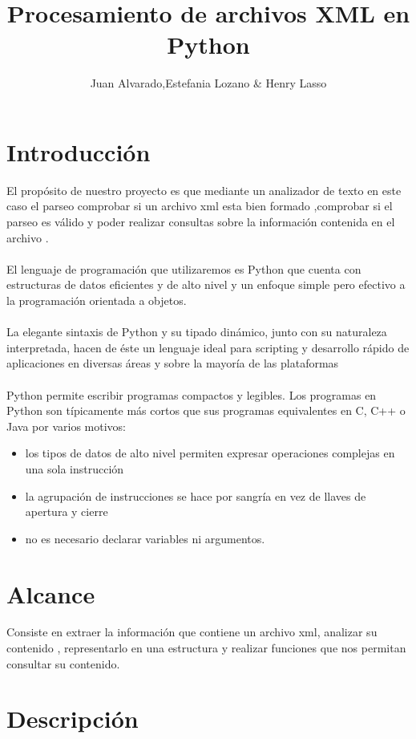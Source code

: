 \documentclass[11pt]{article} %
\title{Procesamiento de archivos  XML  en Python}
\author{Juan Alvarado,Estefania Lozano \&  Henry Lasso}
\begin{document}
\maketitle

\section{Introducción}
El propósito de nuestro proyecto es que  mediante un analizador de texto en este caso el parseo comprobar si un archivo xml esta bien formado ,comprobar si el parseo es válido y poder realizar consultas sobre la información contenida en el archivo .\\ \\
El lenguaje de programación que utilizaremos es Python que cuenta con estructuras de datos eficientes y de alto
nivel y un enfoque simple pero efectivo a la programación orientada a objetos.\\ \\
La elegante sintaxis de Python y su tipado dinámico, junto con su naturaleza interpretada, hacen de éste un lenguaje ideal para scripting y desarrollo rápido de aplicaciones en diversas áreas y sobre la mayoría de las plataformas\\ \\
Python permite escribir programas compactos y legibles. Los programas en Python son típicamente más cortos que sus
programas equivalentes en C, C++ o Java por varios motivos:
\begin{itemize}
\item los tipos de datos de alto nivel permiten expresar operaciones complejas en una sola instrucción
\item la agrupación de instrucciones se hace por sangría en vez de llaves de apertura y cierre
\item  no es necesario declarar variables ni argumentos.
\end{itemize}

\section{Alcance}
Consiste en extraer la información que contiene un archivo xml, analizar su contenido , representarlo en una estructura y realizar funciones que nos permitan consultar su contenido.

\section{Descripción}
\end{document}
